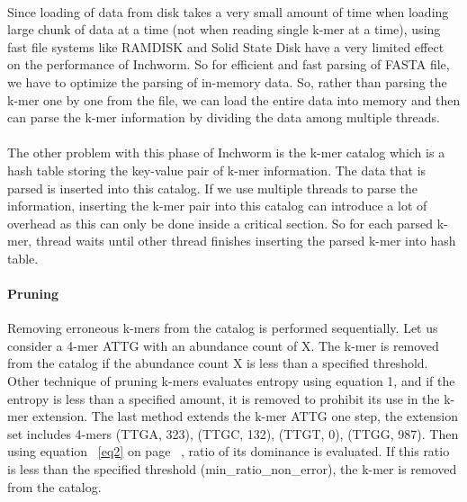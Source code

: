 \label{key}\documentclass[plainarticle, english ,zihtitle,final,hyperref,utf8]{zihpub}
\begin{document}
\paragraph{}
Since loading of data from disk takes a very small amount of time when loading large chunk of data at a time (not when reading single k-mer at a time), using fast file systems like RAMDISK and Solid State Disk have a very limited effect on the performance of Inchworm. So for efficient and fast parsing of FASTA file, we have to optimize the parsing of in-memory data. So, rather than parsing the k-mer one by one from the file, we can load the entire data into memory and then can parse the k-mer information by dividing the data among multiple threads.
\paragraph{}
The other problem with this phase of Inchworm is the k-mer catalog which is a hash table storing the key-value pair of k-mer information. The data that is parsed is inserted into this catalog. If we use multiple threads to parse the information, inserting the k-mer pair into this catalog can introduce a lot of overhead as this can only be done inside a critical section. So for each parsed k-mer,  thread waits until other thread finishes inserting the parsed k-mer into hash table. 
\paragraph{Pruning} Removing erroneous k-mers from the catalog is performed sequentially.  Let us consider a 4-mer ATTG with an abundance count of X. The k-mer is removed from the catalog if the abundance count X is less than a specified threshold. Other technique of pruning k-mers evaluates entropy using equation 1, and if the entropy is less than a specified amount, it is removed to prohibit its use in the k-mer extension. The last method extends the k-mer ATTG one step, the extension set includes 4-mers {(TTGA, 323), (TTGC, 132), (TTGT, 0), (TTGG, 987)}. Then using equation ~\ref{eq2} on page ~\pageref{eq2}, ratio of its dominance is evaluated. If this ratio is less than the specified threshold (min\_ratio\_non\_error), the k-mer is removed from the catalog.
\end{document}
